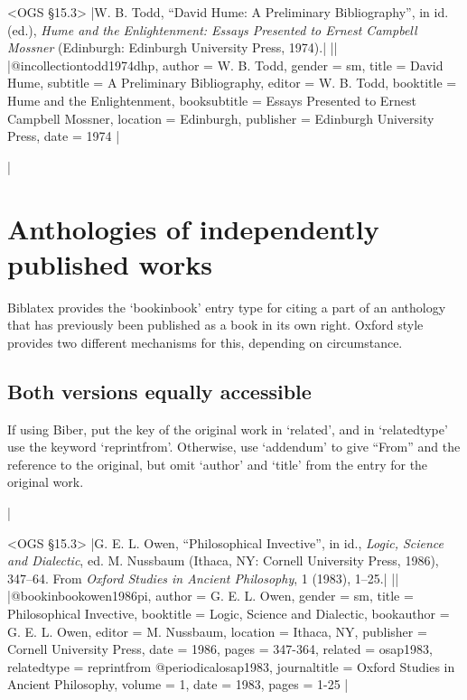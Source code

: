 \documentclass[extrafontsizes,11pt,a4paper,oneside]{memoir}
\newcommand*{\code}[1]{`\textsf{#1}'}
\begin{document}
\bibexample<OGS \S15.3>
|W. B. Todd, \enquote{David Hume: A Preliminary Bibliography}, in id. (ed.), \emph{Hume and the Enlightenment: Essays Presented to Ernest Campbell Mossner} (Edinburgh: Edinburgh University Press, 1974).|%
||%
|@incollection{todd1974dhp,
  author = {W. B. Todd},
  gender = {sm},
  title = {David Hume},
  subtitle = {A Preliminary Bibliography},
  editor = {W. B. Todd},
  booktitle = {Hume and the Enlightenment},
  booksubtitle = {Essays Presented to Ernest Campbell Mossner},
  location = {Edinburgh},
  publisher = {Edinburgh University Press},
  date = {1974}
}|

\todoc|
\section{Anthologies of independently published works}

Biblatex provides the \code{bookinbook} entry type for citing a part of an anthology that has previously been published as a book in its own right. Oxford style provides two different mechanisms for this, depending on circumstance.

\subsection{Both versions equally accessible}

If using Biber, put the key of the original work in \code{related}, and in \code{relatedtype} use the keyword \code{reprintfrom}. Otherwise, use \code{addendum} to give \enquote{From} and the reference to the original, but omit \code{author} and \code{title} from the entry for the original work.

|

\bibexample<OGS \S15.3>
|G. E. L. Owen, \enquote{Philosophical Invective}, in id., \emph{Logic, Science and Dialectic}, ed. M. Nussbaum (Ithaca, NY: Cornell University Press, 1986), 347--64. From \emph{Oxford Studies in Ancient Philosophy}, 1 (1983), 1--25.|%
||%
|@bookinbook{owen1986pi,
  author = {G. E. L. Owen},
  gender = {sm},
  title = {Philosophical Invective},
  booktitle = {Logic, Science and Dialectic},
  bookauthor = {G. E. L. Owen},
  editor = {M. Nussbaum},
  location = {Ithaca, NY},
  publisher = {Cornell University Press},
  date = {1986},
  pages = {347-364},
  related = {osap1983},
  relatedtype = {reprintfrom}
}
@periodical{osap1983,
  journaltitle = {Oxford Studies in Ancient Philosophy},
  volume = {1},
  date = {1983},
  pages = {1-25}
}|
\end{document}
